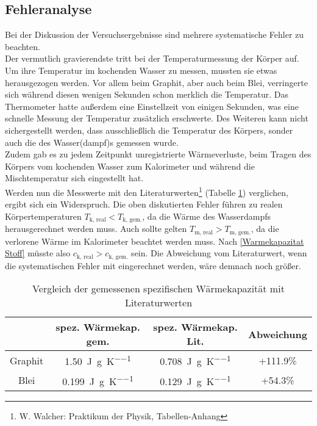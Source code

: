\subsection{Fehleranalyse}
Bei der Diskussion der Versuchsergebnisse sind mehrere systematische Fehler zu beachten. \\
Der vermutlich gravierendste tritt bei der Temperaturmessung der Körper auf. Um ihre Temperatur im kochenden Wasser zu messen, mussten sie etwas herausgezogen werden. Vor allem beim Graphit, aber auch beim Blei, verringerte sich während diesen wenigen Sekunden schon merklich die Temperatur. Das Thermometer hatte außerdem eine Einstellzeit von einigen Sekunden, was eine schnelle Messung der Temperatur zusätzlich erschwerte. Des Weiteren kann nicht sichergestellt werden, dass ausschließlich die Temperatur des Körpers, sonder auch die des Wasser(dampf)s  gemessen wurde. \\
Zudem gab es zu jedem Zeitpunkt unregistrierte Wärmeverluste, beim Tragen des Körpers vom kochenden Wasser zum Kalorimeter und während die Mischtemperatur sich eingestellt hat. \\


Werden nun die Messwerte mit den Literaturwerten\footnote{W. Walcher: \glqq Praktikum der Physik\grqq, Tabellen-Anhang} (Tabelle \ref{spez. Warmekap. Literatur}) verglichen, ergibt sich ein Widerspruch. Die oben diskutierten Fehler führen zu realen Körpertemperaturen $T_\text{k, real}<T_\text{k, gem.}$, da die Wärme des Wasserdampfs herausgerechnet werden muss. Auch sollte gelten $T_\text{m, real}>T_\text{m, gem.}$, da die verlorene Wärme im Kalorimeter beachtet werden muss. Nach \eqref{Warmekapazitat Stoff} müsste also $c_\text{k, real}>c_\text{k, gem.}$ sein. Die Abweichung vom Literaturwert, wenn die systematischen Fehler mit eingerechnet werden, wäre demnach noch größer. \\

\begin{table}[h]
	\begin{center}
		\begin{tabular}{c | c | c | c}
			& spez. Wärmekap. gem. & spez. Wärmekap. Lit. & Abweichung \\
			\hline
			Graphit & \SI{1.50}{\joule\per\gram\per\kelvin} & \SI{0.708}{\joule\per\gram\per\kelvin} & +111.9\% \\
			Blei & \SI{0.199}{\joule\per\gram\per\kelvin} & \SI{0.129}{\joule\per\gram\per\kelvin} & +54.3\%
		\end{tabular}
		\caption{Vergleich der gemessenen spezifischen Wärmekapazität mit Literaturwerten}
		\label{spez. Warmekap. Literatur}
	\end{center}
\end{table}

